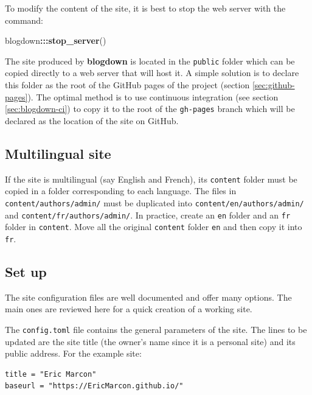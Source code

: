 \documentclass[
  12pt,
  american,
  a4paper,
  extrafontsizes,onecolumn,openright
  ]{memoir}
\newenvironment{Shaded}{\begin{snugshade}}{\end{snugshade}}
\newcommand{\FunctionTok}[1]{\textcolor[rgb]{0.13,0.29,0.53}{\textbf{#1}}}
\newcommand{\NormalTok}[1]{#1}
\newcommand{\SpecialCharTok}[1]{\textcolor[rgb]{0.81,0.36,0.00}{\textbf{#1}}}
\begin{document}
To modify the content of the site, it is best to stop the web server with the command:

\scriptsize

\begin{Shaded}
\begin{Highlighting}[]
\NormalTok{blogdown}\SpecialCharTok{:::}\FunctionTok{stop\_server}\NormalTok{()}
\end{Highlighting}
\end{Shaded}

\normalsize

The site produced by \textbf{blogdown} is located in the \texttt{public} folder which can be copied directly to a web server that will host it.
A simple solution is to declare this folder as the root of the GitHub pages of the project
(section \ref{sec:github-pages}).
The optimal method is to use continuous integration (see section \ref{sec:blogdown-ci}) to copy it to the root of the \texttt{gh-pages} branch which will be declared as the location of the site on GitHub.

\subsection{Multilingual site}\label{multilingual-site}

If the site is multilingual (say English and French), its \texttt{content} folder must be copied in a folder corresponding to each language.
The files in \texttt{content/authors/admin/} must be duplicated into \texttt{content/en/authors}\break\texttt{/admin/} and \texttt{content/fr/authors/admin/}.
In practice, create an \texttt{en} folder and an \texttt{fr} folder in \texttt{content}.
Move all the original \texttt{content} folder \texttt{en} and then copy it into \texttt{fr}.

\subsection{Set up}\label{set-up}

The site configuration files are well documented and offer many options.
The main ones are reviewed here for a quick creation of a working site.

The \texttt{config.toml} file contains the general parameters of the site.
The lines to be updated are the site title (the owner's name since it is a personal site) and its public address.
For the example site:

\begin{verbatim}
title = "Eric Marcon"
baseurl = "https://EricMarcon.github.io/"
\end{verbatim}
\end{document}
